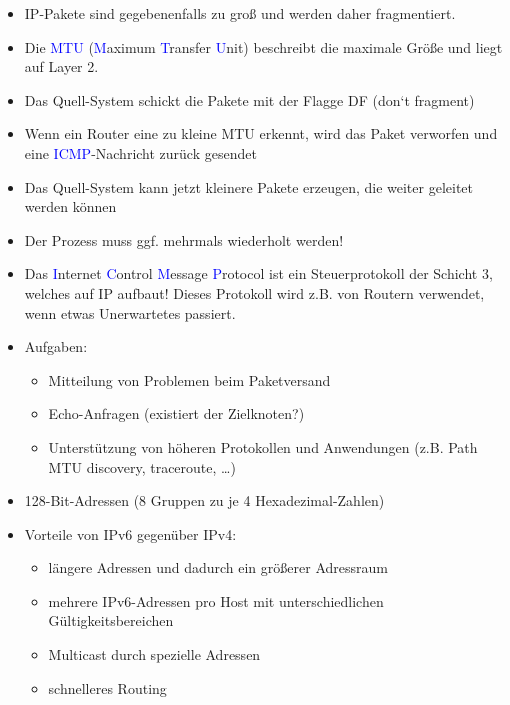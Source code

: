\begin{itemize}
    \item IP-Pakete sind gegebenenfalls zu groß und werden daher fragmentiert.
    \item Die \textcolor{blue}{MTU} (\textcolor{blue}{M}aximum \textcolor{blue}{T}ransfer \textcolor{blue}{U}nit) beschreibt die maximale Größe und liegt auf Layer 2.
\end{itemize}

\begin{itemize}
    \item Das Quell-System schickt die Pakete mit der Flagge DF (don‘t fragment)
    \item Wenn ein Router eine zu kleine MTU erkennt, wird das Paket verworfen und eine \textcolor{blue}{ICMP}-Nachricht zurück gesendet
    \item Das Quell-System kann jetzt kleinere Pakete erzeugen, die weiter geleitet werden können
    \item Der Prozess muss ggf. mehrmals wiederholt werden!
\end{itemize}

\begin{itemize}
    \item Das \textcolor{blue}{I}nternet \textcolor{blue}{C}ontrol \textcolor{blue}{M}essage \textcolor{blue}{P}rotocol ist ein Steuerprotokoll der Schicht 3, welches auf IP aufbaut! Dieses Protokoll wird z.B. von Routern verwendet, wenn etwas Unerwartetes passiert.
    \item Aufgaben:
    \begin{itemize}
        \item Mitteilung von Problemen beim Paketversand
        \item Echo-Anfragen (existiert der Zielknoten?)
        \item Unterstützung von höheren Protokollen und Anwendungen (z.B. Path MTU discovery, traceroute, \ldots)
    \end{itemize}
\end{itemize}

\begin{itemize}
    \item 128-Bit-Adressen (8 Gruppen zu je 4 Hexadezimal-Zahlen)
    \item Vorteile von IPv6 gegenüber IPv4:
    \begin{itemize}
        \item längere Adressen und dadurch ein größerer Adressraum
        \item mehrere IPv6-Adressen pro Host mit unterschiedlichen Gültigkeitsbereichen
        \item Multicast durch spezielle Adressen
        \item schnelleres Routing
    \end{itemize}
\end{itemize}